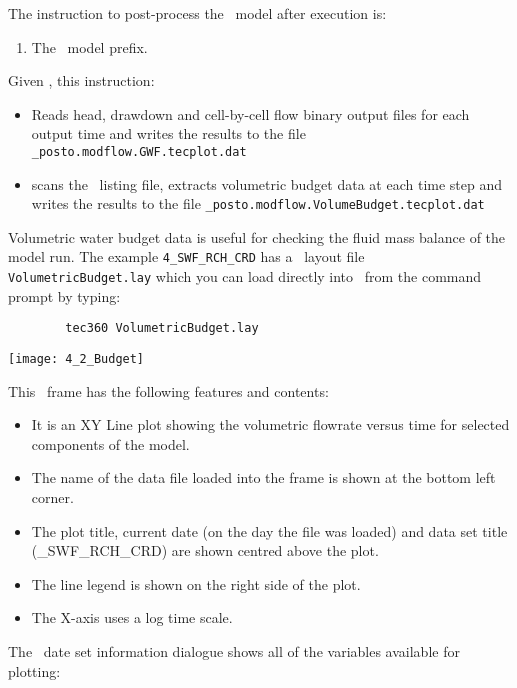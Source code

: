 The instruction to post-process the \mfus\ model after execution is:

    {
        \squish
        \begin{enumerate}
        \item {}  The \mfus\ model prefix.
        \end{enumerate}
        Given , this instruction:
         \begin{itemize}
            \item  Reads head, drawdown and cell-by-cell flow binary output files for each output time and writes the results to the file {\tt \_posto.modflow.GWF.tecplot.dat}
            \item scans the \mfus\ listing file, extracts volumetric budget data at each time step and writes the results to the file {\tt \_posto.modflow.VolumeBudget.tecplot.dat}
         \end{itemize}
        \squish
    }

Volumetric water budget data is useful for checking the fluid mass balance of the model run.  The example {\tt 4\_SWF\_RCH\_CRD} has a \tecplot\ layout file {\tt VolumetricBudget.lay} which you can load directly into \tecplot\ from the command prompt by typing:
    \begin{verbatim}
        tec360 VolumetricBudget.lay
    \end{verbatim}

        \texttt{[image: 4\_2\_Budget]}

This \tecplot\ frame has the following features and contents:
\begin{itemize}
  \item It is an {\sf XY Line} plot showing the volumetric flowrate versus time for selected components of the model.
  \item The name of the data file loaded into the frame is shown at the bottom left corner.
  \item The plot title, current date (on the day the file was loaded) and data set title ({\_SWF\_RCH\_CRD}) are shown centred above the plot.
  \item The line legend is shown on the right side of the plot.
  \item The X-axis uses a log time scale.
\end{itemize}

The \tecplot\ date set information dialogue shows all of the variables available for plotting:

